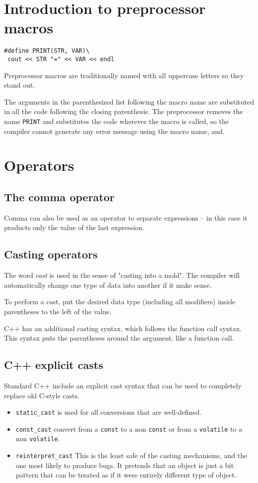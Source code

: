 \documentclass[11pt, a4paper]{book}
\begin{document}
\section{Introduction to preprocessor macros}
\begin{verbatim}
#define PRINT(STR, VAR)\
 cout << STR "=" << VAR << endl
\end{verbatim}
Preprocessor macros are traditionally named with all uppercase letters so they
stand out.

The arguments in the parenthesized list following the macro name are substituted
in all the code following the closing parenthesis. The preprocessor removes the
name \verb|PRINT| and substitutes the code wherever the macro is called, so the
compiler cannot generate any error message using the macro name, and.

\section{Operators}
\subsection{The comma operator}
Comma can also be used as an operator to separate expressions -- in this case it
products only the value of the last expression.
\subsection{Casting operators}
The word \emph{cast} is used in the sense of "casting into a mold". The compiler
will automatically change one type of data into another if it make sense.

To perform a cast, put the desired data type (including all modifiers) inside
parentheses to the left of the value.

C++ has an additional casting syntax, which follows the function call syntax.
This syntax puts the parentheses around the argument, like a function call.
\subsection{C++ explicit casts}
Standard C++ include an explicit cast syntax that can be used to completely
replace old C-style casts.
\begin{itemize}
\item \verb|static_cast| is used for all conversions that are well-defined.
\item \verb|const_cast| convert from a \verb|const| to a non \verb|const| or
from a \verb|volatile| to a non \verb|volatile|.
\item \verb|reinterpret_cast| This is the least safe of the casting mechanisms,
and the one most likely to produce bugs. It pretends that an object is just a
bit pattern that can be treated as if it were entirely different type of object.
\end{itemize}
\end{document}
